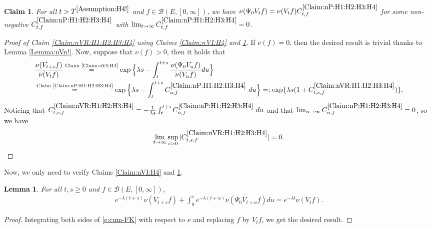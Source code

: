 \documentclass[12pt,a4paper]{amsart}
\numberwithin{equation}{section}
\theoremstyle{plain}
\newtheorem{lem}[thm]{Lemma}
\newtheorem{claim}[thm]{Claim}
\theoremstyle{definition}
\theoremstyle{remark}
\newcounter{N}
\newcounter{n}[N]
\begin{document}
\begin{claim} \label{Claim:nP:H1:H2:H3:H4}
For all $t > T^{\ref{Assumption:H4!}}$ and $f\in \mathcal B(E,[0,\infty])$, we have $\nu(\Psi_0 V_t f) = \nu(V_tf) C^{\ref{Claim:nP:H1:H2:H3:H4}}_{t,f}$ for some non-negative $C^{\ref{Claim:nP:H1:H2:H3:H4}}_{t,f}$ with $\lim_{t\to \infty}C^{\ref{Claim:nP:H1:H2:H3:H4}}_{t,f} = 0$.
\end{claim}
\begin{proof}[{Proof of Claim \ref{Claim:nVR:H1:H2:H3:H4} using Claims \ref{Claim:nVI:H4} and \ref{Claim:nP:H1:H2:H3:H4}}]
If $\nu(f) = 0$, then the desired result is trivial thanks to Lemma \ref{Lemma:nVn!}.
Now, suppose that $\nu(f)>0$, then it holds  that
\begin{align}
&\frac{\nu(V_{t+s} f)} {\nu(V_t f)}
\overset{\text{Claim \ref{Claim:nVI:H4}}}= \exp \Big\{ \lambda s - \int_t^{t+s} \frac{\nu(\Psi_0 V_u f)}{ \nu(V_u f)} du\Big\}
\\&\overset{\text{Claim \ref{Claim:nP:H1:H2:H3:H4}}}= \exp\Big\{\lambda s- \int_t^{t+s} C^{\ref{Claim:nP:H1:H2:H3:H4}}_{u,f} ~du\Big\}
=: \exp\{\lambda s (1+C^{\ref{Claim:nVR:H1:H2:H3:H4}}_{t,s,f}) \}.
\end{align}
Noticing that $C^{\ref{Claim:nVR:H1:H2:H3:H4}}_{t,s,f} = -\frac{1}{\lambda s}\int_t^{t+s} C^{\ref{Claim:nP:H1:H2:H3:H4}}_{u,f} ~du$ and that $\lim_{u\to \infty}C^{\ref{Claim:nP:H1:H2:H3:H4}}_{u,f} = 0$, so we have
\[\lim_{t\to \infty} \sup_{s> 0} |C^{\ref{Claim:nVR:H1:H2:H3:H4}}_{t,s,f}| = 0. \qedhere\]
\end{proof}
Now, we only need to verify Claims \ref{Claim:nVI:H4} and \ref{Claim:nP:H1:H2:H3:H4}.
\begin{lem} \label{Lemma:nuP!}
For all $t, s\geq 0$ and $f\in \mathcal B(E,[0,\infty])$,
\begin{align}
\label{eq:nuP.1}  e^{- \lambda (t+s)} \nu(V_{t+s}f) + \int_0^s e^{- \lambda (t+u)} \nu(\Psi_0 V_{t+u}f) du
  = e^{- \lambda t} \nu(V_t f).
  \end{align}
\end{lem}
\begin{proof}
Integrating  both sides of \eqref{e:cum-FK} with respect to $\nu$ and replacing $f$ by $V_t f$, we get the desired result.
\end{proof}
\end{document}
